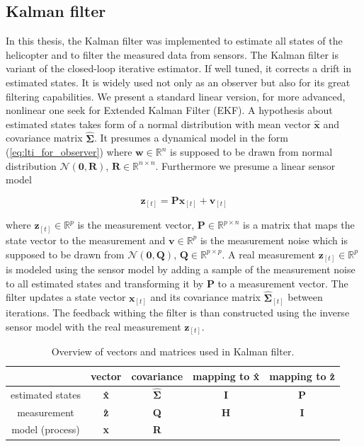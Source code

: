 \subsection{Kalman filter}

In this thesis, the Kalman filter was implemented to estimate all states of the helicopter and to filter the measured data from sensors. The Kalman filter is variant of the closed-loop iterative estimator. If well tuned, it corrects a drift in estimated states. It is widely used not only as an observer but also for its great filtering capabilities. We present a standard linear version, for more advanced, nonlinear one seek for Extended Kalman Filter (EKF). A hypothesis about estimated states takes form of a normal distribution with mean vector $\hat{\textbf{x}}$ and covariance matrix $\hat{\boldsymbol{\Sigma}}$. It presumes a dynamical model in the form (\ref{eq:lti_for_observer}) where $\textbf{w} \in \mathbb{R}^n$ is supposed to be drawn from normal distribution $\mathcal{N}(\textbf{0}, \textbf{R})$, $\textbf{R} \in \mathbb{R}^{n\times n}$. Furthermore we presume a linear sensor model

\begin{equation}
\textbf{\^z}_{[t]} = \textbf{P}\textbf{\^x}_{[t]} + \textbf{v}_{[t]}
\end{equation}

where $\textbf{\^z}_{[t]} \in \mathbb{R}^p$ is the measurement vector, $\textbf{P} \in \mathbb{R}^{p \times n}$ is a matrix that maps the state vector to the measurement and $\textbf{v} \in \mathbb{R}^p$ is the measurement noise which is supposed to be drawn from $\mathcal{N}(\textbf{0}, \textbf{Q})$, $\textbf{Q} \in \mathbb{R}^{p \times p}$. A real measurement $\textbf{z}_{[t]} \in \mathbb{R}^p$ is modeled using the sensor model by adding a sample of the measurement noise to all estimated states and transforming it by \textbf{P} to a measurement vector. The filter updates a state vector $\textbf{\^x}_{[t]}$ and its covariance matrix $\hat{\boldsymbol{\Sigma}}_{[t]}$ between iterations. The feedback withing the filter is than constructed using the inverse sensor model with the real measurement $\textbf{z}_{[t]}$.

\begin{table}[h]
\centering
\begin{tabular}{ccccc}
\hline
& vector & covariance & mapping to \textbf{\^x} & mapping to \textbf{\^z}\\
\hline
estimated states & \textbf{\^x} & $\hat{\boldsymbol{\Sigma}}$ & \textbf{I} & \textbf{P}\\
measurement & \textbf{\^z} & \textbf{Q} & \textbf{H} & \textbf{I}\\
model (process) & \textbf{x} & \textbf{R} & & \\
\hline
\end{tabular}
\caption{Overview of vectors and matrices used in Kalman filter.}
\label{tab:matrices_in_kalman}
\end{table}

